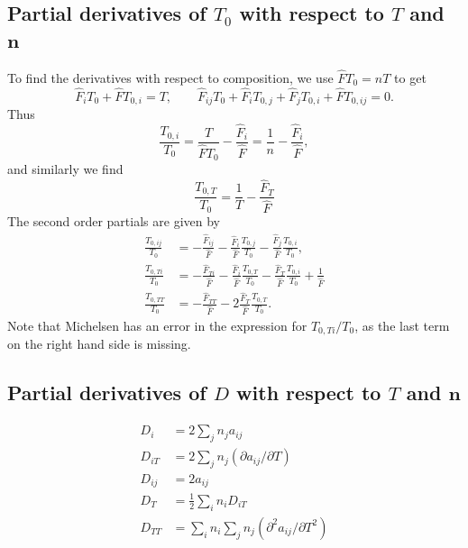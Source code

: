 \documentclass[internal,english]{sintefmemo2012}
\newcommand{\mbn}[0]{\mathbf n}
\newcommand*{\hF}[0]{\hat F}
\newcommand{\lp}{\left(}
\newcommand{\rp}{\right)}
\numberwithin{equation}{section}
\begin{document}
\subsection*{Partial derivatives of $T_0$ with respect to $T$ and
  $\mbn$}
To find the derivatives with respect to composition, we use $\hF T_0 =
nT$ to get
$$
\hF_i T_0 + \hF T_{0,i} = T, \qquad \hF_{ij} T_0 + \hF_i T_{0,j} +
\hF_j T_{0,i} + \hF T_{0,ij} = 0.
$$
Thus
\begin{equation}
  \label{T_0i}
  \frac{T_{0,i}}{T_0} = \frac{T}{\hF T_0}- \frac{\hF_i}{\hF} = \frac1n - \frac{\hF_i}{\hF},
\end{equation}
and similarly we find
\begin{equation}
  \frac{T_{0,T}}{T_0} = \frac{1}{T} - \frac{\hF_T}{\hF}
\end{equation}
The second order partials are given by
\begin{align}
  \frac{T_{0,ij}}{T_0} &= -\frac{\hF_{ij}}{\hF} - \frac{\hF_i}{\hF} \frac{T_{0,j}}{T_0} - \frac{\hF_j}{\hF} \frac{T_{0,i}}{T_0}, \label{T_0ij} \\
  \frac{T_{0,Ti}}{T_0} &= -\frac{\hF_{Ti}}{\hF} - \frac{\hF_i}{\hF}
  \frac{T_{0,T}}{T_0} - \frac{\hF_T}{\hF} \frac{T_{0,i}}{T_0} + \frac{1}{\hF} \label{T_0Ti} \\
  \frac{T_{0,TT}}{T_0} &= -\frac{\hF_{TT}}{\hF} - 2\frac{\hF_T}{\hF}
  \frac{T_{0,T}}{T_0}. \label{T_0TT}
\end{align}
Note that Michelsen \cite{Michelsen07} has an error in the expression
for $T_{0,Ti}/T_0$, as the last term on the right hand side is missing.
\subsection*{Partial derivatives of $D$ with respect to $T$ and
  $\mbn$}
\begin{align}
  D_i   &= 2 \sum_j n_j a_{ij} \\
  D_{iT} &= 2 \sum_j n_j \lp \partial a_{ij}/\partial T \rp \\
  D_{ij} &= 2a_{ij} \\
  D_{T}  &= \tfrac12 \sum_i n_i D_{iT} \\
  D_{TT} &= \sum_i n_i \sum_j n_j \lp \partial^2 a_{ij}/\partial T^2
  \rp
\end{align}
\end{document}
